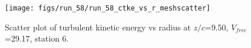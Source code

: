 \begin{figure}[H]
\centering
\texttt{[image: figs/run\_58/run\_58\_ctke\_vs\_r\_meshscatter]}
\caption{Scatter plot of turbulent kinetic energy vs radius at $z/c$=9.50, $V_{free}$=29.17, station 6.}
\label{fig:run_58_ctke_vs_r_meshscatter}
\end{figure}


